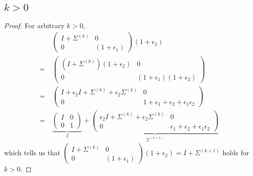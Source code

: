 \documentclass[11pt,a4paper]{article}
\begin{document}
\subsection{$k > 0$}
\begin{proof}
    For arbitrary $k > 0$,
\begin{align}
    & \left(\begin{array}{c|c} I+\Sigma^{(k)}&0\\\hline0&(1+\epsilon_1)\end{array}\right) (1+\epsilon_2) \\
    =\ & \left(\begin{array}{c|c}(I+\Sigma^{(k)}) (1+\epsilon_2)&0\\\hline0&(1+\epsilon_1)(1+\epsilon_2) \end{array}\right) \\
    =\ & \left(\begin{array}{c|c}
            I + \epsilon_2 I+ \Sigma^{(k)}+ \epsilon_2 \Sigma^{(k)} & 0\\\hline
            0 &  1+\epsilon_1+\epsilon_2+\epsilon_1\epsilon_2
        \end{array}\right) \\
    =\ & \underbrace{\left( \begin{array}{c|c}  I & 0 \\\hline 0 & 1
            \end{array} \right)}_{I}
    + \underbrace{ \left(\begin{array}{c|c}
            \epsilon_2 I+ \Sigma^{(k)}+ \epsilon_2 \Sigma^{(k)} & 0\\\hline
            0 &  \epsilon_1+\epsilon_2+\epsilon_1\epsilon_2
        \end{array}\right) }_{\Sigma^{(k+1)}}
        \end{align}
        which tells us that 
    $\left(\begin{array}{c|c} I+\Sigma^{(k)}&0\\\hline0&(1+\epsilon_1)\end{array}\right) (1+\epsilon_2)=I+\Sigma^{(k+1)}$
    holds for $k>0$.
\end{proof}

\setcounter{section}{22}
\section{}
\end{document}
